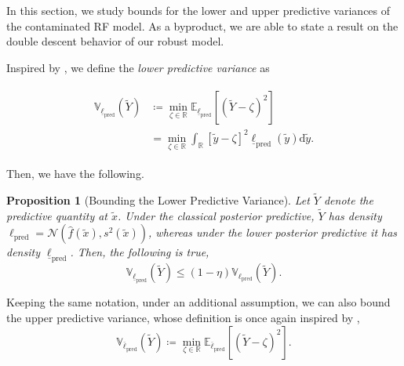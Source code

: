 \documentclass[12pt, english, oneside, a4paper]{article}
\newtheorem{proposition}[theorem]{Proposition}
\newcommand{\x}{\boldsymbol{x}}
\begin{document}
In this section, we study bounds for the lower and upper predictive variances of the contaminated RF model. As a byproduct, we are able to state a result on the double descent behavior of our robust model.

Inspired by \citet[Appendix G.1]{walley}, we define the {\em lower predictive variance} as

\begin{align*}
\begin{split}    \mathbb{V}_{\underline{\ell}_\text{pred}}(\tilde{Y}) &\coloneqq \min_{\zeta\in\mathbb{R}} \mathbb{E}_{\underline{\ell}_\text{pred}}[(\tilde{Y}-\zeta)^2]\\
    &=\min_{\zeta\in\mathbb{R}} \int_{\mathbb{R}} [\tilde y - \zeta]^2 \underline{\ell}_\text{pred} (\tilde y) \text{d} \tilde y.
\end{split}
\end{align*}


Then, we have the following.

\begin{proposition}[Bounding the Lower Predictive Variance]\label{prop-var}
Let $\tilde Y$ denote the predictive quantity at $\tilde x$.
Under the classical posterior predictive, $\tilde Y$ has density
$\ell_\text{pred}=\mathcal N(\hat f(\tilde x),s^2(\tilde x))$,
whereas under the lower posterior predictive it has density $\underline{\ell}_\text{pred}$. Then, the following is true,
    $$\mathbb{V}_{\underline{\ell}_\text{pred}}(\tilde{Y}) \leq (1-\eta) \mathbb{V}_{{\ell}_\text{pred}}(\tilde{Y}).
    $$
\end{proposition}



Keeping the same notation, under an additional assumption, we can also bound the upper predictive variance, whose definition is once again inspired by  \citet[Appendix G.1]{walley},
\begin{equation*}
    \mathbb{V}_{\overline{\ell}_\text{pred}}(\tilde{Y}) \coloneqq \min_{\zeta\in\mathbb{R}} \mathbb{E}_{\overline{\ell}_\text{pred}}[(\tilde{Y}-\zeta)^2].
\end{equation*}
\end{document}
